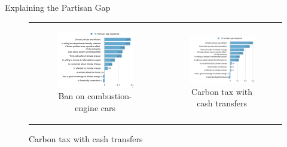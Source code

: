 \begin{frame}{Explaining the Partisan Gap}
\begin{figure}[h!]
	\caption{Gelbach decomposition of the partisan gap in support for:}
	\setlength\extrarowheight{-1pt}
\begin{center}
	\begin{tabular}{cc}
		\begin{subfigure}{0.48\textwidth}
		\caption{Ban on combustion-engine cars}
			\includegraphics[width=\textwidth]{../../figures/Gelbach/gelbach_right_standard_D2SD_small}
		\end{subfigure}&
		\begin{subfigure}{0.48\textwidth}
		\caption{Carbon tax with cash transfers}
			\includegraphics[width=\textwidth]{../../figures/Gelbach/gelbach_right_tax_transfers_D2SD_small}
		\end{subfigure}\\
	\end{tabular}
\end{center}
\end{figure}
\end{frame}

